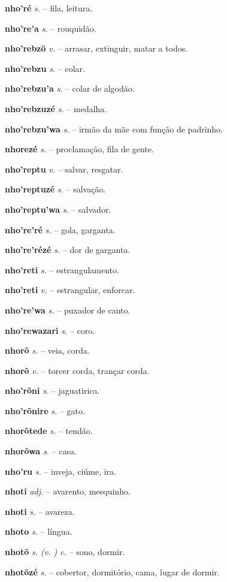 \textbf{nho'ré} \textit{s.} -- fila, leitura.

\textbf{nho're'a} \textit{s.} -- rouquidão.

\textbf{nho'rebzö} \textit{v.} -- arrasar, extinguir, matar a todos.

\textbf{nho'rebzu} \textit{s.} -- colar.

\textbf{nho'rebzu'a} \textit{s.} -- colar de algodão.

\textbf{nho'rebzuzé} \textit{s.} -- medalha.

\textbf{nho'rebzu'wa} \textit{s.} -- irmão da mãe com função de padrinho.

\textbf{nhorezé} \textit{s.} -- proclamação, fila de gente.

\textbf{nho'reptu} \textit{v.} -- salvar, resgatar.

\textbf{nho'reptuzé} \textit{s.} -- salvação.

\textbf{nho'reptu'wa} \textit{s.} -- salvador.

\textbf{nho're'ré} \textit{s.} -- gola, garganta.

\textbf{nho're'rézé} \textit{s.} -- dor de garganta.

\textbf{nho'reti} \textit{s.} -- estrangulamento.

\textbf{nho'reti} \textit{v.} -- estrangular, enforcar.

\textbf{nho're'wa} \textit{s.} -- puxador de canto.

\textbf{nho'rewazari} \textit{s.} -- coro.

\textbf{nhorõ} \textit{s.} -- veia, corda.

\textbf{nhorõ} \textit{v.} -- torcer corda, trançar corda.

\textbf{nho'rõni} \textit{s.} -- jaguatirica.

\textbf{nho'rõnire} \textit{s.} -- gato.

\textbf{nhorõtede} \textit{s.} -- tendão.

\textbf{nhorõwa} \textit{s.} -- casa.

\textbf{nho'ru} \textit{s.} -- inveja, ciúme, ira.

\textbf{nhoti} \textit{adj.} -- avarento, mesquinho.

\textbf{nhoti} \textit{s.} -- avareza.

\textbf{nhoto} \textit{s.} -- língua.

\textbf{nhotõ} \textit{s. (v. ) c.} -- sono, dormir.

\textbf{nhotõzé} \textit{s.} -- cobertor, dormitório, cama, lugar de dormir.


